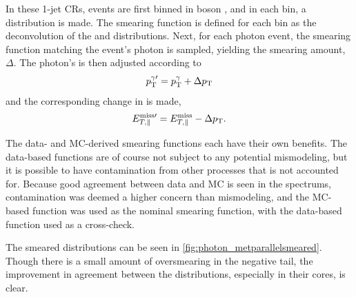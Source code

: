 In these 1-jet \acp{CR}, events are first binned in boson \pt, and in each bin, a \metl distribution is made. The smearing function is defined for each bin as the deconvolution of the \dyjets and \gjets \metl distributions.
Next, for each photon event, the smearing function matching the event's photon \pt is sampled, yielding the smearing amount, $\Delta$\pt. The photon's \pt is then adjusted according to 
%
\begin{equation}
p_{\text{T}}^{\gamma\prime} = p_{\text{T}}^\gamma + \Delta p_{\text{T}} 
\end{equation} 
%
and the corresponding change in \met is made,
%
\begin{equation}
E_{T,\parallel}^{\text{miss}\prime} = E_{T,\parallel}^{\mathrm{miss}} - \Delta p_{\text{T}}.
\end{equation}

The data- and \ac{MC}-derived smearing functions each have their own benefits. The data-based functions are of course not subject to any potential mismodeling, but it is possible to have contamination from other processes that is not accounted for. Because good agreement between data and \ac{MC} is seen in the \metl spectrums, contamination was deemed a higher concern than mismodeling, and the \ac{MC}-based function was used as the nominal smearing function, with the data-based function used as a cross-check.

The smeared \metl distributions can be seen in \autoref{fig:photon_metparallelsmeared}. Though there is a small amount of oversmearing in the negative tail, the improvement in agreement between the distributions, especially in their cores, is clear.

